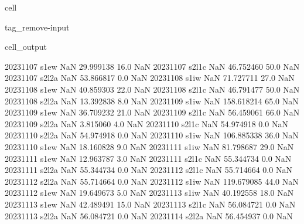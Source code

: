 \documentclass[letterpaper,10pt,english]{jupyterBook}
\begin{document}
\begin{sphinxuseclass}{cell}
\begin{sphinxuseclass}{tag_remove-input}
\begin{sphinxVerbatimOutput}
\begin{sphinxuseclass}{cell_output}
\begin{sphinxVerbatim}[commandchars=\\\{\}]
2023\PYGZhy{}11\PYGZhy{}07        s1\PYGZus{}ew           NaN   29.999138    16.0         NaN
2023\PYGZhy{}11\PYGZhy{}07       s2\PYGZus{}l1c           NaN   46.752460    50.0         NaN
2023\PYGZhy{}11\PYGZhy{}07       s2\PYGZus{}l2a           NaN   53.866817     0.0         NaN
2023\PYGZhy{}11\PYGZhy{}08        s1\PYGZus{}iw           NaN   71.727711    27.0         NaN
2023\PYGZhy{}11\PYGZhy{}08        s1\PYGZus{}ew           NaN   40.859303    22.0         NaN
2023\PYGZhy{}11\PYGZhy{}08       s2\PYGZus{}l1c           NaN   46.791477    50.0         NaN
2023\PYGZhy{}11\PYGZhy{}08       s2\PYGZus{}l2a           NaN   13.392838     8.0         NaN
2023\PYGZhy{}11\PYGZhy{}09        s1\PYGZus{}iw           NaN  158.618214    65.0         NaN
2023\PYGZhy{}11\PYGZhy{}09        s1\PYGZus{}ew           NaN   36.709232    21.0         NaN
2023\PYGZhy{}11\PYGZhy{}09       s2\PYGZus{}l1c           NaN   56.459061    66.0         NaN
2023\PYGZhy{}11\PYGZhy{}09       s2\PYGZus{}l2a           NaN    3.815060     4.0         NaN
2023\PYGZhy{}11\PYGZhy{}10       s2\PYGZus{}l1c           NaN   54.974918     0.0         NaN
2023\PYGZhy{}11\PYGZhy{}10       s2\PYGZus{}l2a           NaN   54.974918     0.0         NaN
2023\PYGZhy{}11\PYGZhy{}10        s1\PYGZus{}iw           NaN  106.885338    36.0         NaN
2023\PYGZhy{}11\PYGZhy{}10        s1\PYGZus{}ew           NaN   18.160828     9.0         NaN
2023\PYGZhy{}11\PYGZhy{}11        s1\PYGZus{}iw           NaN   81.798687    29.0         NaN
2023\PYGZhy{}11\PYGZhy{}11        s1\PYGZus{}ew           NaN   12.963787     3.0         NaN
2023\PYGZhy{}11\PYGZhy{}11       s2\PYGZus{}l1c           NaN   55.344734     0.0         NaN
2023\PYGZhy{}11\PYGZhy{}11       s2\PYGZus{}l2a           NaN   55.344734     0.0         NaN
2023\PYGZhy{}11\PYGZhy{}12       s2\PYGZus{}l1c           NaN   55.714664     0.0         NaN
2023\PYGZhy{}11\PYGZhy{}12       s2\PYGZus{}l2a           NaN   55.714664     0.0         NaN
2023\PYGZhy{}11\PYGZhy{}12        s1\PYGZus{}iw           NaN  119.679085    44.0         NaN
2023\PYGZhy{}11\PYGZhy{}12        s1\PYGZus{}ew           NaN   19.649673     5.0         NaN
2023\PYGZhy{}11\PYGZhy{}13        s1\PYGZus{}iw           NaN   40.192558    18.0         NaN
2023\PYGZhy{}11\PYGZhy{}13        s1\PYGZus{}ew           NaN   42.489491    15.0         NaN
2023\PYGZhy{}11\PYGZhy{}13       s2\PYGZus{}l1c           NaN   56.084721     0.0         NaN
2023\PYGZhy{}11\PYGZhy{}13       s2\PYGZus{}l2a           NaN   56.084721     0.0         NaN
2023\PYGZhy{}11\PYGZhy{}14       s2\PYGZus{}l2a           NaN   56.454937     0.0         NaN

\end{sphinxVerbatim}
\end{sphinxuseclass}
\end{sphinxVerbatimOutput}
\end{sphinxuseclass}
\end{sphinxuseclass}
\end{document}
